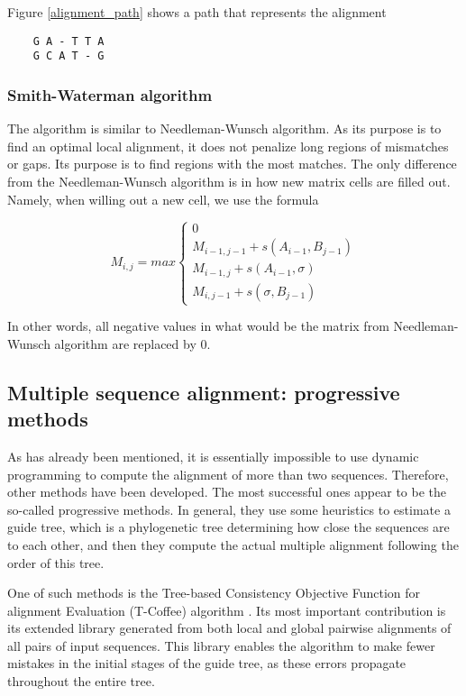 Figure \ref{alignment_path} shows a path that represents the alignment

\begin{verbatim}
    G A - T T A
    G C A T - G
\end{verbatim}

\subsubsection{Smith-Waterman algorithm}

The algorithm is similar to Needleman-Wunsch algorithm. As its purpose is to find an optimal local alignment, it does not
penalize long regions of mismatches or gaps. Its purpose is to find regions with the most matches. The only difference from the Needle\-man-Wunsch 
algorithm is in how new matrix cells are filled out. Namely, when willing out a new cell, we use the formula

\[ M_{i, j} = max
    \begin{cases}
        0   \\
        M_{i-1, j-1} + s(A_{i-1}, B_{j-1}) \\
        M_{i-1, j} + s(A_{i-1}, \sigma)    \\
        M_{i, j-1} + s(\sigma, B_{j-1})
    \end{cases}
\]

In other words, all negative values in what would be the matrix from Needle\-man-Wunsch algorithm are replaced by 0.

\subsection{Multiple sequence alignment: progressive methods}

As has already been mentioned, it is essentially impossible to use dynamic programming to compute the alignment of more than two sequences.
Therefore, other methods have been developed. The most successful ones appear to be the so-called progressive methods. In general,
they use some heuristics to estimate a guide tree, which is a phylogenetic tree determining how close the sequences are to each other,
and then they compute the actual multiple alignment following the order of this tree.

One of such methods is the Tree-based Consistency Objective Function for alignment Evaluation (T-Coffee) algorithm \citep{t_coffee}.
Its most important contribution is its extended library generated from both local and global pairwise alignments of all pairs of input sequences.
This library enables the algorithm to make fewer mistakes in the initial stages of the guide tree, as these errors propagate throughout the entire tree.

